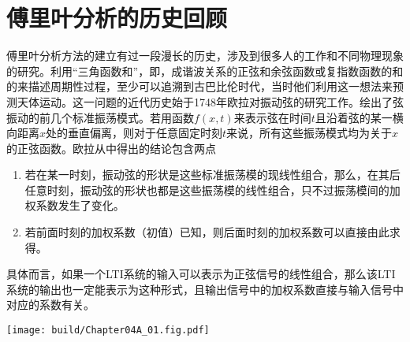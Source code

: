 \section{傅里叶分析的历史回顾}

傅里叶分析方法的建立有过一段漫长的历史，涉及到很多人的工作和不同物理现象的研究。利用“三角函数和”，即，成谐波关系的正弦和余弦函数或复指数函数的和的来描述周期性过程，至少可以追溯到古巴比伦时代，当时他们利用这一想法来预测天体运动。这一问题的近代历史始于1748年欧拉对振动弦的研究工作。绘出了弦振动的前几个标准振荡模式。若用函数$f(x,t)$来表示弦在时间$t$且沿着弦的某一横向距离$x$处的垂直偏离，则对于任意固定时刻$t$来说，所有这些振荡模式均为关于$x$的正弦函数。欧拉从中得出的结论包含两点
\begin{enumerate}
    \item 若在某一时刻，振动弦的形状是这些标准振荡模的现线性组合，那么，在其后任意时刻，振动弦的形状也都是这些振荡模的线性组合，只不过振荡模间的加权系数发生了变化。
    \item 若前面时刻的加权系数（初值）已知，则后面时刻的加权系数可以直接由此求得。
\end{enumerate}
具体而言，如果一个LTI系统的输入可以表示为正弦信号的线性组合，那么该LTI系统的输出也一定能表示为这种形式，且输出信号中的加权系数直接与输入信号中对应的系数有关。

\begin{Figure}[振动弦的标准振荡模]
    \texttt{[image: build/Chapter04A\_01.fig.pdf]}\hspace{0.75cm}
\end{Figure}

